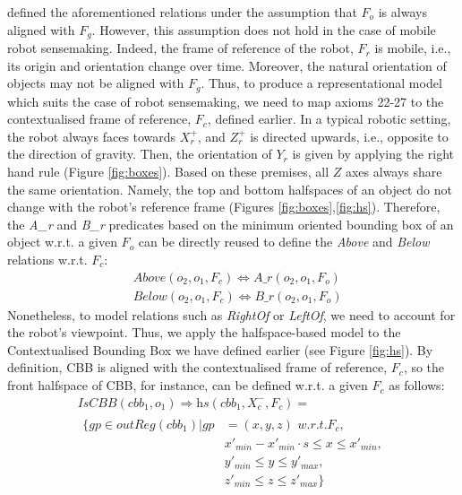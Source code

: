 \documentclass{article}
\begin{document}
\cite{borrmann_query_2010} defined the aforementioned relations under the assumption that $F_o$ is always aligned with $F_g$. However, this assumption does not hold in the case of mobile robot sensemaking. Indeed, the frame of reference of the robot, $F_r$ is mobile, i.e., its origin and orientation change over time. Moreover, the natural orientation of objects may not be aligned with $F_g$. %
Thus, to produce a representational model which suits the case of robot sensemaking, we need to map axioms 22-27 to the contextualised frame of reference, $F_c$, defined earlier. %
In a typical robotic setting, the robot always faces towards $X_{r}^{+}$, and $Z_{r}^{+}$ is directed upwards, i.e., opposite to the direction of gravity. Then, the orientation of $Y_{r}$ is given by applying the right hand rule (Figure \ref{fig:boxes}). Based on these premises, all $Z$ axes always share the same orientation. Namely, the top and bottom halfspaces of an object do not change with the robot's reference frame (Figures \ref{fig:boxes},\ref{fig:hs}). Therefore, the \textit{A\_r} and \textit{B\_r} predicates based on the minimum oriented bounding box of an object w.r.t. a given $F_o$ can be directly reused to define the \textit{Above} and \textit{Below} relations w.r.t. $F_c$: 
\begin{align}
& \textit{Above} (o_2,o_1,F_c) \Leftrightarrow \textit{A\_r} (o_2,o_1,F_o) \\
& \textit{Below} (o_2,o_1,F_c) \Leftrightarrow \textit{B\_r} (o_2,o_1,F_o)  
\end{align}
Nonetheless, to model relations such as \textit{RightOf} or \textit{LeftOf}, we need to account for the robot's viewpoint. Thus, we apply the halfspace-based model to the Contextualised Bounding Box we have defined earlier (see Figure \ref{fig:hs}). By definition, CBB is aligned with the contextualised frame of reference, $F_c$, so the front halfspace of CBB, for instance, can be defined w.r.t. a given $F_c$ as follows:
\begin{multline}
    \textit{IsCBB}(cbb_1,o_1) \Rightarrow \textit{hs}(cbb_1,X_{c}^{-},F_c) = \\
\begin{split}
    \{gp \in \textit{outReg}(cbb_1) | gp &{} =(x,y,z) \textit{ w.r.t.} F_c,  \\
  &  x'_{min} - x'_{min} \cdot s \leq x \leq x'_{min}, \\
  &  y'_{min} \leq y \leq y'_{max}, \\
  &  z'_{min} \leq z \leq z'_{max}
    \} \end{split}
\end{multline}
\end{document}

